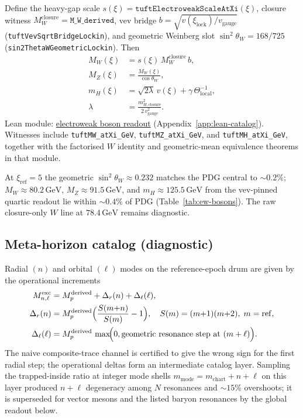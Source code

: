 \documentclass[11pt]{amsart}
\begin{document}
Define the heavy-gap scale $s(\xi)=\texttt{tuftElectroweakScaleAtXi}(\xi)$, closure witness
$M_W^{\mathrm{closure}}=\texttt{M\_W\_derived}$, vev bridge
$b=\sqrt{v(\xi_{\mathrm{lock}})/v_{\mathrm{gauge}}}$ (\texttt{tuftVevSqrtBridgeLockin}), and geometric Weinberg slot
$\sin^2\theta_W=168/725$ (\texttt{sin2ThetaWGeometricLockin}). Then
\begin{align}
  M_W(\xi) &= s(\xi)\,M_W^{\mathrm{closure}}\,b, \\
  M_Z(\xi) &= \frac{M_W(\xi)}{\cos\theta_W}, \\
  m_H(\xi) &= \sqrt{2\lambda}\,v(\xi) + \gamma\,\Theta_{\mathrm{local}}^{-1}, \\
  \lambda &= \frac{m_{H,\mathrm{closure}}^2}{2\,v_{\mathrm{gauge}}^2}.
\end{align}
Lean module: \hyperref[lean:ew-boson-readout]{electroweak boson readout} (Appendix~\ref{app:lean-catalog}).
Witnesses include \texttt{tuftMW\_atXi\_GeV}, \texttt{tuftMZ\_atXi\_GeV}, and \texttt{tuftMH\_atXi\_GeV}, together with the factorised $W$ identity and geometric-mean equivalence theorems in that module.

At $\xi_{\mathrm{ref}}=5$ the geometric $\sin^2\theta_W \approx 0.232$ matches the PDG central \cite{pdg2024} to $\sim 0.2\%$; $M_W \approx 80.2\,\mathrm{GeV}$, $M_Z \approx 91.5\,\mathrm{GeV}$, and $m_H \approx 125.5\,\mathrm{GeV}$ from the vev-pinned quartic readout lie within $\sim 0.4\%$ of PDG (Table~\ref{tab:ew-bosons}). The raw closure-only $W$ line at $78.4\,\mathrm{GeV}$ remains diagnostic.

\subsection{Meta-horizon catalog (diagnostic)}

Radial $(n)$ and orbital $(\ell)$ modes on the reference-epoch drum are given by the operational increments
\begin{align}
  M_{n,\ell}^{\mathrm{exc}} &=
    M_p^{\mathrm{derived}} +
    \Delta_r(n) + \Delta_\ell(\ell), \\
  \Delta_r(n) &=
    M_p^{\mathrm{derived}}\Bigl(\frac{S(m{+}n)}{S(m)}-1\Bigr),\quad
    S(m)=(m{+}1)(m{+}2),\; m=\mathrm{ref}, \\
  \Delta_\ell(\ell) &=
    M_p^{\mathrm{derived}}\,
    \max\!\Bigl(0,\text{geometric resonance step at }(m+\ell)\Bigr).
\end{align}
The naive composite-trace channel is certified to give the wrong sign for the first radial step; the operational deltas form an intermediate catalog layer. Sampling the trapped-inside ratio at integer mode shells $m_{\mathrm{mode}}=m_{\mathrm{chart}}+n+\ell$ on this layer produced $n+\ell$ degeneracy among $N$ resonances and $\sim 15\%$ overshoots; it is superseded for vector mesons and the listed baryon resonances by the global readout below.
\end{document}
